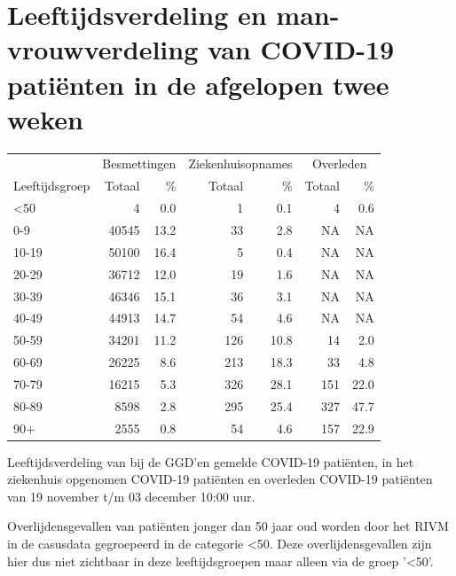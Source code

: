 \documentclass[
  english,
  man,floatsintext]{apa6}
\begin{document}
\hypertarget{leeftijdsverdeling-en-man-vrouwverdeling-van-covid-19-patiuxebnten-in-de-afgelopen-twee-weken}{%
\section{Leeftijdsverdeling en man-vrouwverdeling van COVID-19 patiënten in de afgelopen twee weken}\label{leeftijdsverdeling-en-man-vrouwverdeling-van-covid-19-patiuxebnten-in-de-afgelopen-twee-weken}}

\begin{table}
\centering\begingroup\fontsize{11}{13}\selectfont

\begin{threeparttable}
\begin{tabular}{lrrrrrr}
\toprule
\multicolumn{1}{c}{ } & \multicolumn{2}{c}{Besmettingen} & \multicolumn{2}{c}{Ziekenhuisopnames} & \multicolumn{2}{c}{Overleden} \\
\cmidrule(l{3pt}r{3pt}){2-3} \cmidrule(l{3pt}r{3pt}){4-5} \cmidrule(l{3pt}r{3pt}){6-7}
Leeftijdsgroep & Totaal & \% & Totaal & \% & Totaal & \%\\
\midrule
<50 & 4 & 0.0 & 1 & 0.1 & 4 & 0.6\\
0-9 & 40545 & 13.2 & 33 & 2.8 & NA & NA\\
10-19 & 50100 & 16.4 & 5 & 0.4 & NA & NA\\
20-29 & 36712 & 12.0 & 19 & 1.6 & NA & NA\\
30-39 & 46346 & 15.1 & 36 & 3.1 & NA & NA\\
40-49 & 44913 & 14.7 & 54 & 4.6 & NA & NA\\
50-59 & 34201 & 11.2 & 126 & 10.8 & 14 & 2.0\\
60-69 & 26225 & 8.6 & 213 & 18.3 & 33 & 4.8\\
70-79 & 16215 & 5.3 & 326 & 28.1 & 151 & 22.0\\
80-89 & 8598 & 2.8 & 295 & 25.4 & 327 & 47.7\\
90+ & 2555 & 0.8 & 54 & 4.6 & 157 & 22.9\\
\bottomrule
\end{tabular}
\begin{tablenotes}
\item[1] Leeftijdsverdeling van bij de GGD’en gemelde COVID-19 patiënten, in het ziekenhuis opgenomen COVID-19 patiënten en overleden COVID-19 patiënten van 19 november t/m 03 december 10:00 uur.
\item[2] Overlijdensgevallen van patiënten jonger dan 50 jaar oud worden door het RIVM in de casusdata gegroepeerd in de categorie <50. Deze overlijdensgevallen zijn hier dus niet zichtbaar in deze leeftijdsgroepen maar alleen via de groep '<50'.
\end{tablenotes}
\end{threeparttable}
\endgroup{}
\end{table}
\end{document}
